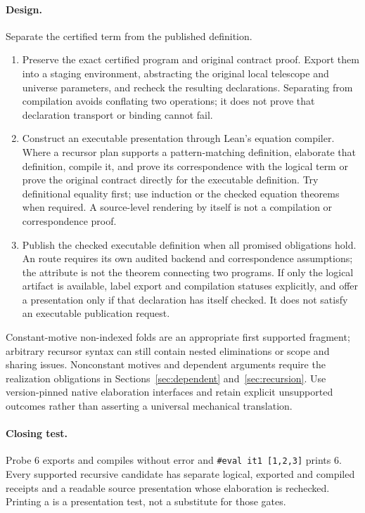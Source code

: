 \paragraph{Design.} Separate the certified term from the published definition.
\begin{enumerate}
\item Preserve the exact certified program and original contract proof. Export
them into a staging environment, abstracting the original local telescope and
universe parameters, and recheck the resulting declarations. Separating
 from compilation avoids conflating two operations; it does not
prove that declaration transport or binding cannot fail.
\item Construct an executable presentation through Lean's equation compiler.
Where a recursor plan supports a pattern-matching definition, elaborate that
definition, compile it, and prove its correspondence with the logical term
or prove the original contract directly for the executable definition.
Try definitional equality first; use induction or the checked equation
theorems when required. A source-level  rendering by itself is not
a compilation or correspondence proof.
\item Publish the checked executable definition when all promised obligations
hold. An  route requires its own audited backend and
correspondence assumptions; the attribute is not the theorem connecting two
programs. If only the logical artifact is available, label export and
compilation statuses explicitly, and offer a  presentation
only if that declaration has itself checked. It does not satisfy an executable
publication request.
\end{enumerate}
Constant-motive non-indexed folds are an appropriate first supported fragment;
arbitrary recursor syntax can still contain nested eliminations or scope and
sharing issues. Nonconstant motives and dependent arguments require the
realization obligations in Sections~\ref{sec:dependent} and~\ref{sec:recursion}.
Use version-pinned native elaboration interfaces and retain explicit unsupported
outcomes rather than asserting a universal mechanical translation.

\paragraph{Closing test.} Probe 6 exports and compiles without error and
\texttt{\#eval it1 [1,2,3]} prints 6. Every supported recursive candidate has
separate logical, exported and compiled receipts and a readable source
presentation whose elaboration is rechecked. Printing a  is a
presentation test, not a substitute for those gates.

